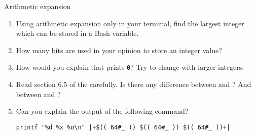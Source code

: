 
\begin{exercise}[Black]{Arithmetic expansion}
    \vspace{-5mm}
    \begin{enumerate}
        \item Using arithmetic expansion only in your terminal, find the largest integer which can be stored in a Bash variable.
        \item How many bits are used in your opinion to store an integer value?
        \item How would you explain that  prints \texttt{0}? Try to change  with larger integers.
        \item Read section 6.5 of the  carefully.
              Is there any difference between  and ?
              And between  and ?
        \item Can you explain the output of the following command?
              \begin{lstlisting}[style=MyBash]
                  printf "%d %x %o\n" |+$(( 64#_ )) $(( 64#_ )) $(( 64#_ ))+|
              \end{lstlisting}
    \end{enumerate}
    \vspace{-5mm}
\end{exercise}
